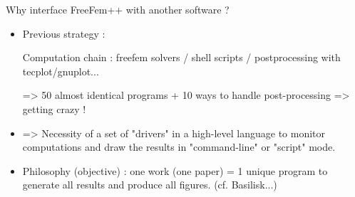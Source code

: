 \documentclass{beamer}
\newcommand{\ssp}{\vspace{.2cm} }
\begin{document}
\begin{frame}{Why interface FreeFem++ with another software ?}

\small

\begin{itemize}[<+->]

\item %
Previous strategy :

Computation chain : freefem solvers / shell scripts / postprocessing with tecplot/gnuplot...




=> 50 almost identical programs + 10 ways to handle post-processing => getting crazy !

\ssp 

\item %
=> Necessity of a  set of "drivers" in a high-level language to monitor computations and draw the results in "command-line" or "script" mode.


\item 
Philosophy (objective) : one work (one paper) = 1 unique program to generate all results and produce all figures.
(cf. Basilisk...)




\end{itemize}


\end{frame}
\end{document}
